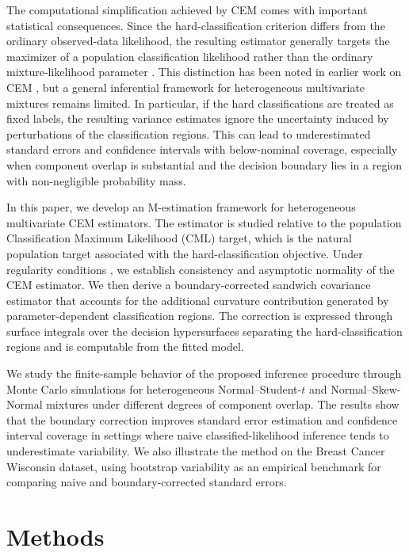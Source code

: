 \documentclass[pdflatex,sn-mathphys-ay]{sn-jnl}%
\theoremstyle{thmstyleone}%
\theoremstyle{thmstyletwo}%
\theoremstyle{thmstylethree}%
\begin{document}
The computational simplification achieved by CEM comes with important statistical consequences. Since the hard-classification criterion differs from the ordinary observed-data likelihood, the resulting estimator generally targets the maximizer of a population classification likelihood rather than the ordinary mixture-likelihood parameter \citep{pal2024gaussian}. This distinction has been noted in earlier work on CEM \citep{celeux1992classification}, but a general inferential framework for heterogeneous multivariate mixtures remains limited. In particular, if the hard classifications are treated as fixed labels, the resulting variance estimates ignore the uncertainty induced by perturbations of the classification regions. This can lead to underestimated standard errors and confidence intervals with below-nominal coverage, especially when component overlap is substantial and the decision boundary lies in a region with non-negligible probability mass.

In this paper, we develop an M-estimation framework \citep{vandervaart1998} for heterogeneous multivariate CEM estimators. The estimator is studied relative to the population Classification Maximum Likelihood (CML) target, which is the natural population target associated with the hard-classification objective. Under regularity conditions \citep{Huber1967}, we establish consistency and asymptotic normality of the CEM estimator. We then derive a boundary-corrected sandwich covariance estimator \citep{white1982maximum} that accounts for the additional curvature contribution generated by parameter-dependent classification regions. The correction is expressed through surface integrals over the decision hypersurfaces separating the hard-classification regions and is computable from the fitted model.

We study the finite-sample behavior of the proposed inference procedure through Monte Carlo simulations for heterogeneous Normal--Student-$t$ and Normal--Skew-Normal mixtures under different degrees of component overlap. The results show that the boundary correction improves standard error estimation and confidence interval coverage in settings where naive classified-likelihood inference tends to underestimate variability. We also illustrate the method on the Breast Cancer Wisconsin dataset, using bootstrap variability as an empirical benchmark for comparing naive and boundary-corrected standard errors.

\section{Methods}
\label{sec:methodology}
\end{document}
